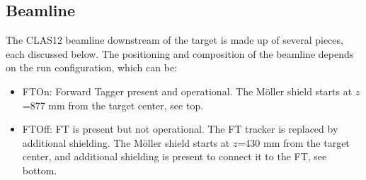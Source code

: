 \subsection{Beamline} \label{sec:beamline}

The CLAS12 beamline downstream of the target is made up of several pieces, each discussed below. The positioning and composition of the beamline
depends on the run configuration, which can be:

\begin{itemize}
	\item FTOn: Forward Tagger present and operational. The M\"oller shield starts at $z$=877 mm from the target center, see  top.
	\item FTOff: FT is present but not operational. The FT tracker is replaced by additional shielding.
                 The M\"oller shield starts at $z$=430 mm from the target center, and additional shielding
                 is present to connect it to the FT, see  bottom.
\end{itemize}


